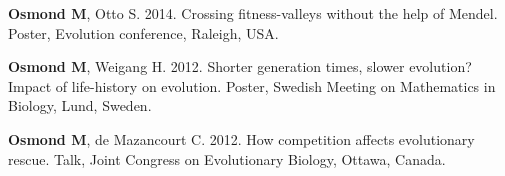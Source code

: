 \documentclass[12pt]{article}
\begin{document}

\textbf{Osmond M}, Otto S. 2014. Crossing fitness-valleys without the help of Mendel. Poster, Evolution conference, Raleigh, USA.







\textbf{Osmond M}, Weigang H. 2012. Shorter generation times, slower evolution? Impact of life-history on evolution. Poster, Swedish Meeting on Mathematics in Biology, Lund, Sweden.



\textbf{Osmond M}, de Mazancourt C. 2012. How competition affects evolutionary rescue. Talk, Joint Congress on Evolutionary Biology, Ottawa, Canada.

\end{document}
